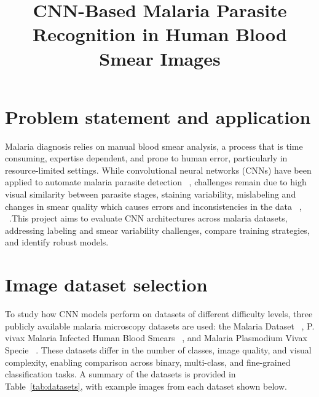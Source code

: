 \documentclass[10pt,twocolumn,letterpaper,pagenumbers]{article}
\begin{document}
\pagestyle{plain} %

\title{CNN-Based Malaria Parasite Recognition in Human Blood Smear Images}


\maketitle


\section{Problem statement and application} Malaria diagnosis relies on manual blood smear analysis, a process that is time consuming, expertise dependent, and prone to human error, particularly in resource-limited settings. While convolutional neural networks (CNNs) have been applied to automate malaria parasite detection ~\cite{JMAMSJ}, challenges remain due to high visual similarity between parasite stages, staining variability, mislabeling and changes in smear quality which causes errors and inconsistencies in the data ~\cite{ahamed_malaria_2025}, ~\cite{rubio_maturana_2022}.This project aims to evaluate CNN architectures across malaria datasets, addressing labeling and smear variability challenges, compare training strategies, and identify robust models.

\section{Image dataset selection}
To study how CNN models perform on datasets of different difficulty levels, three publicly available malaria microscopy datasets are used: the Malaria Dataset ~\cite{miracle9to9}, P. vivax Malaria Infected Human Blood Smears ~\cite{orvile}, and Malaria Plasmodium Vivax Specie ~\cite{saife245}. These datasets differ in the number of classes, image quality, and visual complexity, enabling comparison across binary, multi-class, and fine-grained classification tasks. A summary of the datasets is provided in Table~\ref{tab:datasets}, with example images from each dataset shown below.
\end{document}
